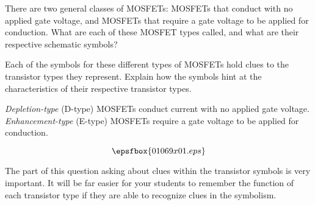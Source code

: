 

There are two general classes of MOSFETs: MOSFETs that conduct with no applied gate voltage, and MOSFETs that require a gate voltage to be applied for conduction.  What are each of these MOSFET types called, and what are their respective schematic symbols?

Each of the symbols for these different types of MOSFETs hold clues to the transistor types they represent.  Explain how the symbols hint at the characteristics of their respective transistor types.







{\it Depletion-type} (D-type) MOSFETs conduct current with no applied gate voltage.  {\it Enhancement-type} (E-type) MOSFETs require a gate voltage to be applied for conduction.

$$\epsfbox{01069x01.eps}$$







The part of this question asking about clues within the transistor symbols is very important.  It will be far easier for your students to remember the function of each transistor type if they are able to recognize clues in the symbolism.




